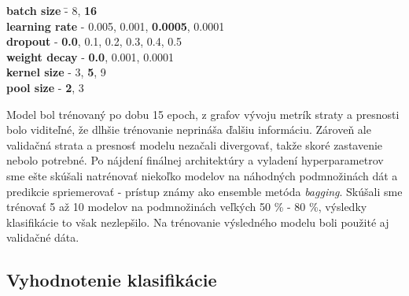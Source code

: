 \begin{tabbing}
    \indent \textbf{batch size} \quad\quad\quad\quad \= - 8, \textbf{16}\\
    \indent \textbf{learning rate}                   \> - 0.005, 0.001, \textbf{0.0005}, 0.0001\\
    \indent \textbf{dropout}                         \> - \textbf{0.0}, 0.1, 0.2, 0.3, 0.4, 0.5\\
    \indent \textbf{weight decay}                    \> - \textbf{0.0}, 0.001, 0.0001\\
    \indent \textbf{kernel size}                     \> - 3, \textbf{5}, 9\\
    \indent \textbf{pool size}                       \> - \textbf{2}, 3\\
\end{tabbing}

Model bol trénovaný po dobu 15 epoch, z grafov vývoju metrík straty a presnosti bolo viditeľné, že dlhšie trénovanie neprináša ďalšiu informáciu. Zároveň ale validačná strata a presnosť modelu nezačali divergovať, takže skoré zastavenie nebolo potrebné. Po nájdení finálnej architektúry a vyladení hyperparametrov sme ešte skúšali natrénovať niekoľko modelov na náhodných podmnožinách dát a predikcie spriemerovať - prístup známy ako ensemble metóda \textit{bagging}. Skúšali sme trénovať 5 až 10 modelov na podmnožinách veľkých 50 \% - 80 \%, výsledky klasifikácie to však nezlepšilo. Na trénovanie výsledného modelu boli použité aj validačné dáta.


\subsection{Vyhodnotenie klasifikácie}

